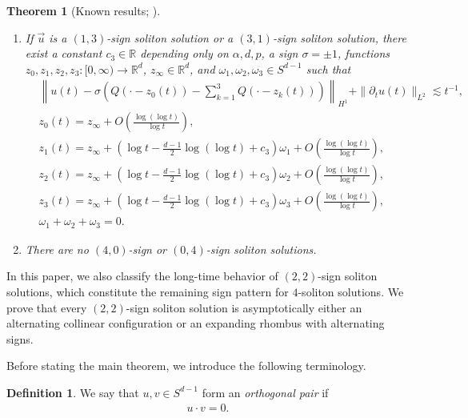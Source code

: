 \documentclass[reqno]{amsart}
\theoremstyle{plain}
\newtheorem{theorem}{Theorem}[section]
\theoremstyle{definition}
\newtheorem{definition}{Definition}[section]
\numberwithin{equation}{section}
\begin{document}
\begin{theorem}[Known results; \cite{CD,CMYZ,I2,I3}]
\begin{enumerate}
\item If $\vec{u}$ is a $(1,3)$-sign soliton solution or a $(3,1)$-sign soliton solution, there exist a constant $c_3\in \mathbb{R}$ depending only on $\alpha,d,p$, a sign $\sigma=\pm 1$, functions $z_0,z_1,z_2,z_3:[0,\infty)\to\mathbb{R}^d$, $z_{\infty}\in \mathbb{R}^d$, and $\omega_1,\omega_2,\omega_3\in S^{d-1}$ such that
\begin{align*}
&\left\| u(t)-\sigma\left(Q(\cdot-z_0(t))-\sum_{k=1}^3Q(\cdot-z_k(t))\right)\right\|_{H^1}+\|{\partial}_tu(t)\|_{L^2}\lesssim t^{-1},
\\
&z_0(t)=z_{\infty}+O\left(\frac{\log{(\log{t})}}{\log{t}}\right),
\\
&z_1(t)=z_{\infty}+\left(\log{t}-\frac{d-1}{2}\log{(\log{t})}+c_3\right)\omega_1+O\left(\frac{\log{(\log{t})}}{\log{t}}\right),
\\
&z_2(t)=z_{\infty}+\left(\log{t}-\frac{d-1}{2}\log{(\log{t})}+c_3\right)\omega_2+O\left(\frac{\log{(\log{t})}}{\log{t}}\right),
\\
&z_3(t)=z_{\infty}+\left(\log{t}-\frac{d-1}{2}\log{(\log{t})}+c_3\right)\omega_3+O\left(\frac{\log{(\log{t})}}{\log{t}}\right),
\\
&\omega_1+\omega_2+\omega_3=0.
\end{align*}

\item There are no $(4,0)$-sign or $(0,4)$-sign soliton solutions.
\end{enumerate}
\end{theorem}

In this paper, we also classify the long-time behavior of $(2,2)$-sign soliton solutions, which constitute the remaining sign pattern for $4$-soliton solutions. We prove that every $(2,2)$-sign soliton solution is asymptotically either an alternating collinear configuration or an expanding rhombus with alternating signs.

Before stating the main theorem, we introduce the following terminology.

\begin{definition}
We say that $u,v\in S^{d-1}$ form an \textit{orthogonal pair} if
\begin{align*}
u\cdot v=0.
\end{align*}
\end{definition}
\end{document}
